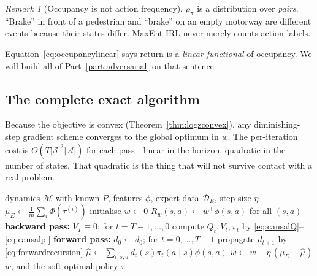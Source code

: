\documentclass[11pt]{article}
\theoremstyle{plain}
\theoremstyle{definition}
\theoremstyle{remark}
\newtheorem{remark}[theorem]{Remark}
\renewcommand{\S}{\mathcal{S}}
\newcommand{\A}{\mathcal{A}}
\begin{document}
\begin{remark}[Occupancy is not action frequency]
$\rho_\pi$ is a distribution over \emph{pairs}. ``Brake'' in front of a
pedestrian and ``brake'' on an empty motorway are different events because
their states differ. MaxEnt IRL never merely counts action labels.
\end{remark}

Equation~\eqref{eq:occupancylinear} says return is a \emph{linear
functional} of occupancy. We will build all of Part~\ref{part:adversarial}
on that sentence.

\subsection{The complete exact algorithm}

Because the objective is convex (Theorem~\ref{thm:logzconvex}), any
diminishing-step gradient scheme converges to the global optimum in $w$.
The per-iteration cost is $O(T|\S|^2|\A|)$ for each pass---linear in the
horizon, quadratic in the number of states. That quadratic is the thing
that will not survive contact with a real problem.

\begin{algorithm}[H]
\caption{Exact Maximum Causal Entropy IRL (finite $\S,\A$, known $P$)}
\begin{algorithmic}[1]
\Require dynamics $\mathcal{M}$ with known $P$, features $\phi$, expert
data $\mathcal{D}_E$, step size $\eta$
\State $\mu_E \gets \frac1m\sum_i \Phi(\tau^{(i)})$
\State initialise $w\gets0$
  \State $R_w(s,a)\gets w^\top\phi(s,a)$ for all $(s,a)$
  \State \textbf{backward pass:} $V_T\equiv0$; for $t=T-1,\ldots,0$ compute
  $Q_t,V_t,\pi_t$ by \eqref{eq:causalQ}--\eqref{eq:causalpi} 
  \State \textbf{forward pass:} $d_0\gets d_0$; for $t=0,\ldots,T-1$
  propagate $d_{t+1}$ by \eqref{eq:forwardrecursion} 
  \State $\hat\mu \gets \sum_{t,s,a} d_t(s)\pi_t(a\mid s)\phi(s,a)$
  \State $w \gets w + \eta\,(\mu_E - \hat\mu)$ 
\EndFor
\State \Return $w$, and the soft-optimal policy $\pi$
\end{algorithmic}
\label{alg:maxcausalent}
\end{algorithm}
\end{document}
